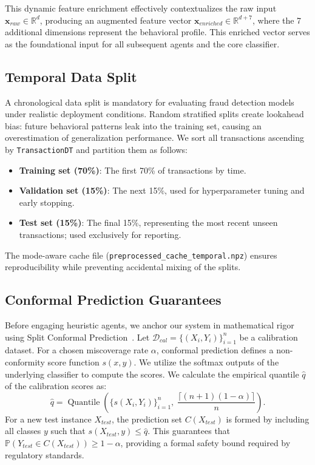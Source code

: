 \documentclass[12pt,a4paper]{article}
\begin{document}
This dynamic feature enrichment effectively contextualizes the raw input
$\mathbf{x}_{raw} \in \mathbb{R}^{d}$, producing an augmented feature vector
$\mathbf{x}_{enriched} \in \mathbb{R}^{d+7}$, where the 7 additional dimensions
represent the behavioral profile. This enriched vector serves as the foundational
input for all subsequent agents and the core classifier.

\subsection{Temporal Data Split}
\label{subsec:temporal_split}

A chronological data split is mandatory for evaluating fraud detection models
under realistic deployment conditions. Random stratified splits create
lookahead bias: future behavioral patterns leak into the training set, causing
an overestimation of generalization performance. We sort all transactions
ascending by \texttt{TransactionDT} and partition them as follows:

\begin{itemize}
  \item \textbf{Training set (70\%)}: The first 70\% of transactions by time.
  \item \textbf{Validation set (15\%)}: The next 15\%, used for
        hyperparameter tuning and early stopping.
  \item \textbf{Test set (15\%)}: The final 15\%, representing the
        most recent unseen transactions; used exclusively for reporting.
\end{itemize}

The mode-aware cache file (\texttt{preprocessed\_cache\_temporal.npz}) ensures
reproducibility while preventing accidental mixing of the splits.

\subsection{Conformal Prediction Guarantees}

Before engaging heuristic agents, we anchor our system in mathematical rigor
using Split Conformal Prediction~\cite{b31,b33}. Let $\mathcal{D}_{cal} =
\{(X_i,Y_i)\}_{i=1}^{n}$ be a calibration dataset. For a chosen miscoverage
rate $\alpha$, conformal prediction defines a non-conformity score function
$s(x,y)$. We utilize the softmax outputs of the underlying classifier to compute
the scores. We calculate the empirical quantile $\hat{q}$ of the calibration
scores as:
\begin{equation}
  \hat{q} = \operatorname{Quantile}\!\left(
    \{s(X_i,Y_i)\}_{i=1}^{n},\;
    \frac{\lceil(n+1)(1-\alpha)\rceil}{n}
  \right).
  \label{eq:conformal_quantile}
\end{equation}
For a new test instance $X_{test}$, the prediction set $C(X_{test})$ is formed
by including all classes $y$ such that $s(X_{test},y)\leq\hat{q}$. This
guarantees that $\mathbb{P}(Y_{test}\in C(X_{test}))\geq 1-\alpha$, providing a
formal safety bound required by regulatory standards.
\end{document}
